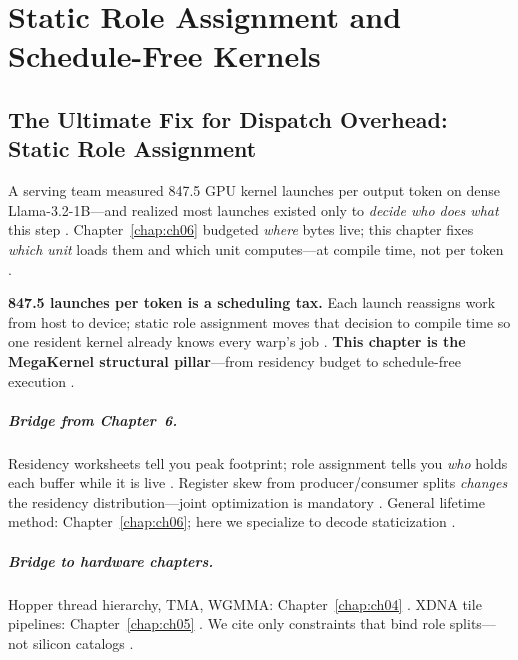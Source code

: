 \chapter{Static Role Assignment and Schedule-Free Kernels}
\label{chap:ch07}

\section{The Ultimate Fix for Dispatch Overhead: Static Role Assignment}
\label{sec:industrial_hook}

A serving team measured 847.5 GPU kernel launches per output token on dense Llama-3.2-1B---and realized most launches existed only to \emph{decide who does what} this step \citep{taxbreak2026,patel2025llminference}.
Chapter~\ref{chap:ch06} budgeted \emph{where} bytes live; this chapter fixes \emph{which unit} loads them and which unit computes---at compile time, not per token \citep{yirage2026,shah2024flashattention3}.

\textbf{847.5 launches per token is a scheduling tax.} Each launch reassigns work from host to device; static role assignment moves that decision to compile time so one resident kernel already knows every warp's job \citep{taxbreak2026,mpk2025,nvidia2024cudagraphs}.
\textbf{This chapter is the MegaKernel structural pillar}---from residency budget to schedule-free execution \citep{wu2024mirage,memoryfloor2026}.

\paragraph{Bridge from Chapter~6.}
Residency worksheets tell you peak footprint; role assignment tells you \emph{who} holds each buffer while it is live \citep{yirage2026,chen2020compilerbasedhardw}.
Register skew from producer/consumer splits \emph{changes} the residency distribution---joint optimization is mandatory \citep{shah2024flashattention3,dao2022flashattention}.
General lifetime method: Chapter~\ref{chap:ch06}; here we specialize to decode staticization \citep{patel2025llminference}.

\paragraph{Bridge to hardware chapters.}
Hopper thread hierarchy, TMA, WGMMA: Chapter~\ref{chap:ch04} \citep{nvidia2022hopper,semianalysis2024tma}.
XDNA tile pipelines: Chapter~\ref{chap:ch05} \citep{amd2024xdna,amd2024aie}.
We cite only constraints that bind role splits---not silicon catalogs \citep{yirage2026}.

